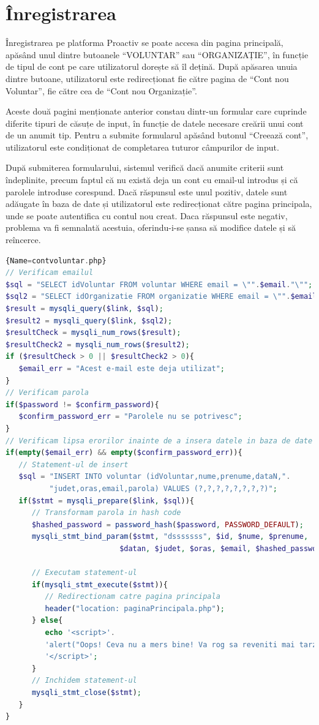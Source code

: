 \documentclass[12pt,a4paper]{report}
\begin{document}
\section{Înregistrarea}
\par
Înregistrarea pe platforma Proactiv se poate accesa din pagina principală, apăsând unul dintre butoanele  “VOLUNTAR” sau  “ORGANIZAȚIE”, în funcție de tipul de cont pe care utilizatorul dorește să îl dețină. După apăsarea unuia dintre butoane, utilizatorul este redirecționat fie către pagina de  “Cont nou Voluntar”, fie către cea de  “Cont nou Organizație”.
\\
\par
Aceste două pagini menționate anterior constau dintr-un formular care cuprinde diferite tipuri de căsuțe de input, în funcție de datele necesare creării unui cont de un anumit tip. Pentru a submite formularul apăsând butonul  “Creează cont”, utilizatorul este condiționat de completarea tuturor câmpurilor de input. 
\\
\par
După submiterea formularului, sistemul verifică dacă anumite criterii sunt îndeplinite, precum faptul că nu există deja un cont cu email-ul introdus și că parolele introduse corespund. Dacă răspunsul este unul pozitiv, datele sunt adăugate în baza de date și utilizatorul este redirecționat către pagina principala, unde se poate autentifica cu contul nou creat. Daca răspunsul este negativ, problema va fi semnalată acestuia, oferindu-i-se șansa să modifice datele și să reîncerce.
\\
\begin{lstlisting}[basicstyle=\small, language=PHP]{Name=contvoluntar.php}
// Verificam emailul
$sql = "SELECT idVoluntar FROM voluntar WHERE email = \"".$email."\"";
$sql2 = "SELECT idOrganizatie FROM organizatie WHERE email = \"".$email."\"";
$result = mysqli_query($link, $sql);
$result2 = mysqli_query($link, $sql2);
$resultCheck = mysqli_num_rows($result);
$resultCheck2 = mysqli_num_rows($result2);
if ($resultCheck > 0 || $resultCheck2 > 0){
   $email_err = "Acest e-mail este deja utilizat";
}
// Verificam parola
if($password != $confirm_password){
   $confirm_password_err = "Parolele nu se potrivesc";
}
// Verificam lipsa erorilor inainte de a insera datele in baza de date
if(empty($email_err) && empty($confirm_password_err)){
   // Statement-ul de insert
   $sql = "INSERT INTO voluntar (idVoluntar,nume,prenume,dataN,".
          "judet,oras,email,parola) VALUES (?,?,?,?,?,?,?,?)";
   if($stmt = mysqli_prepare($link, $sql)){
      // Transformam parola in hash code
      $hashed_password = password_hash($password, PASSWORD_DEFAULT); 
      mysqli_stmt_bind_param($stmt, "dsssssss", $id, $nume, $prenume,
                          $datan, $judet, $oras, $email, $hashed_password);

      // Executam statement-ul
      if(mysqli_stmt_execute($stmt)){
         // Redirectionam catre pagina principala
         header("location: paginaPrincipala.php");
      } else{
         echo '<script>'.
         'alert("Oops! Ceva nu a mers bine! Va rog sa reveniti mai tarziu");'.
         '</script>';
      }
      // Inchidem statement-ul
      mysqli_stmt_close($stmt);
   }
}
\end{lstlisting}
\end{document}
